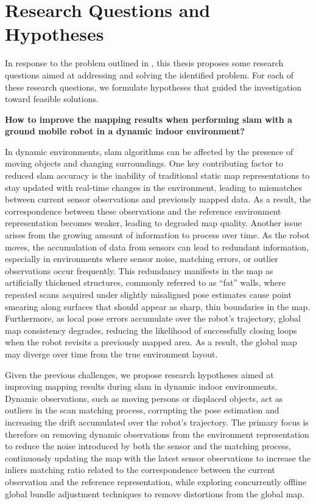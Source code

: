 \section{Research Questions and Hypotheses}\label{sec:intro:rq+h}

In response to the problem outlined in ,
this thesis proposes some research questions aimed at addressing and solving
the identified problem. For each of these research questions, we
formulate hypotheses that guided the investigation toward feasible solutions.

\begin{question}\label{question:mapping}
\textbf{How to improve the mapping results when performing \gls{slam} with a
ground mobile robot in a dynamic indoor environment?}
\end{question}

In dynamic environments, \gls{slam} algorithms can be
affected by the presence of moving objects and changing surroundings.
One key contributing factor to reduced \gls{slam} accuracy is the inability of
traditional static map representations to stay updated with real-time changes
in the environment, leading to mismatches between current sensor observations
and previously mapped data. As a result, the correspondence between these
observations and the reference environment representation becomes weaker,
leading to degraded map quality.
Another issue arises from the growing amount of information
to process over time. As the robot moves,
the accumulation of data from sensors can lead to redundant information,
especially in environments where sensor noise, matching errors, or
outlier observations occur frequently.
This redundancy manifests in the map as artificially thickened structures,
commonly referred to as ``fat'' walls, where repeated scans acquired under
slightly misaligned pose estimates cause point smearing along surfaces that
should appear as sharp, thin boundaries in the map.
Furthermore, as local pose errors accumulate over the robot's trajectory,
global map consistency degrades, reducing the likelihood of successfully
closing loops when the robot revisits a previously mapped area. As a result,
the global map may diverge over time from the true environment layout.

Given the previous challenges, we propose research hypotheses aimed at
improving mapping results during \gls{slam} in dynamic indoor environments.
Dynamic observations, such as moving persons or displaced objects, act as
outliers in the scan matching process, corrupting the pose estimation and
increasing the drift accumulated over the robot's trajectory.
The primary focus is therefore on removing dynamic observations from the
environment representation to reduce the noise introduced by both the sensor
and the matching process, continuously updating the map with the latest sensor
observations to increase the inliers matching ratio related to the
correspondence between the current observation and the reference representation,
while exploring concurrently offline global bundle adjustment techniques
to remove distortions from the global map.

